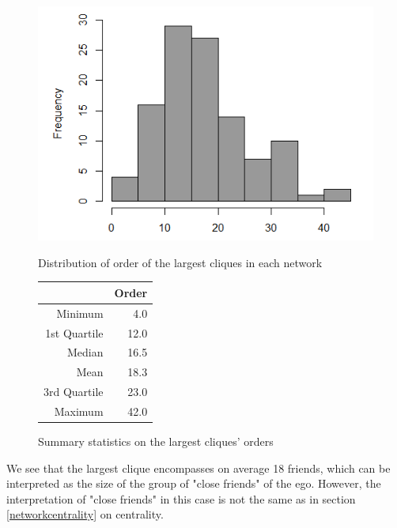\documentclass[11pt]{article}       %
\begin{document}
\begin{figure}[H]
\centering
\begin{minipage}[b]{0.47\linewidth}
\vspace{0pt}
\includegraphics[width=\linewidth]{largestclique.png}
\caption{Distribution of order of the largest cliques in each network}
\end{minipage}
\hspace{0.5cm}
\begin{minipage}[b]{0.45\linewidth}
\captionsetup{type=table}
\centering
\begin{tabular}[b]{rr}
  \hline
 & Order \\ 
  \hline
Minimum & 4.0 \\ 
  1st Quartile & 12.0 \\ 
  Median & 16.5 \\ 
  Mean & 18.3 \\ 
  3rd Quartile & 23.0 \\ 
  Maximum & 42.0 \\ 
   \hline
\end{tabular}
\vspace{0.8cm}
\caption{Summary statistics on the largest cliques' orders}
\end{minipage}
\end{figure}

We see that the largest clique encompasses on average 18 friends, which can  be interpreted as the size of the group of "close friends" of the ego. However, the interpretation of "close friends" in this case is not the same as in section \ref{networkcentrality} on centrality.
\end{document}
